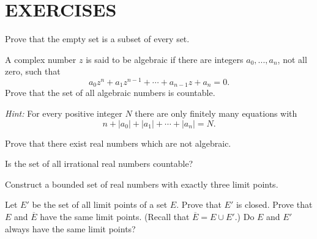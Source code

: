 
\section*{EXERCISES}

\begin{myExercise}
    \label{ex:2.1}
    Prove that the empty set is a subset of every set.
\end{myExercise}

\begin{myExercise}
    \label{ex:2.2}
    A complex number $z$ is said to be algebraic 
    if there are integers $a_0, ... , a_n$, not all
    zero, such that
    \begin{equation*}
        a_{0} z^{n} 
        + a_{1} z^{n-1}
        +\cdots
        + a_{n-1} z
        + a_n = 0 .
    \end{equation*}
    Prove that the set of all algebraic numbers is countable. 
    
    \emph{Hint:} For every positive integer $N$ 
    there are only finitely many equations with
    \begin{equation*}
        n 
        + |a_0|
        + |a_1|
        + \cdots
        + |a_n| = N .
    \end{equation*}
\end{myExercise}

\begin{myExercise}
    \label{ex:2.3}
    Prove that there exist real numbers which are not algebraic.
\end{myExercise}

\begin{myExercise}
    \label{ex:2.4}
    Is the set of all irrational real numbers countable?
\end{myExercise}

\begin{myExercise}
    \label{ex:2.5}
    Construct a bounded set of real numbers with exactly three limit points.
\end{myExercise}

\begin{myExercise}
    \label{ex:2.6}
    Let $E'$ be the set of all limit points of a set $E$. 
    Prove that $E'$ is closed. 
    Prove that $E$ and $\overline{E}$ have the same limit points. 
    (Recall that $\overline{E} = E \cup E'$.) 
    Do $E$ and $E'$ always have the same limit points?
\end{myExercise}

